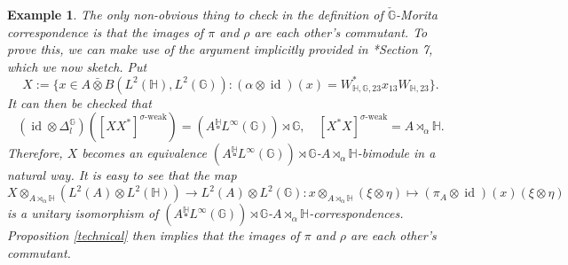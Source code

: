 \documentclass[reqno]{amsart}
\numberwithin{equation}{section}
\newtheorem{Exa}[Theorem]{Example}
\DeclareMathOperator{\id}{\mathrm{id}}
\newcommand{\G}{\mathbb{G}}
\newcommand{\ovot}{\bar{\otimes}}
\begin{document}
\begin{Exa}
The only non-obvious thing to check in the definition of $\check{\G}$-Morita correspondence is that the images of $\pi$ and $\rho$ are each other's commutant. To prove this, we can make use of the argument implicitly provided in \cite{Vae05}*{Section 7}, which we now sketch. Put
  $$X:= \{x \in A \ovot B(L^2(\mathbb{H}), L^2(\G)): (\alpha\otimes \id)(x) = W_{\mathbb{H}, \G, 23}^*x_{13}W_{\mathbb{H}, 23}\}.$$
 It can then be checked that
 $$(\id \otimes \Delta_l^\G)([XX^*]^{\sigma\text{-weak}})= (A \overset{\mathbb{H}}{\square} L^\infty(\G))\rtimes \G, \quad [X^*X]^{\sigma\text{-weak}}= A\rtimes_\alpha \mathbb{H}.$$
 Therefore, $X$ becomes an equivalence $(A \overset{\mathbb{H}}{\square} L^\infty(\G))\rtimes \G$-$A\rtimes_\alpha \mathbb{H}$-bimodule in a natural way. It is easy to see that the map
 $$X \otimes_{A\rtimes_\alpha \mathbb{H}} (L^2(A)\otimes L^2(\mathbb{H}))\to L^2(A)\otimes L^2(\G): x \otimes_{A\rtimes_\alpha \mathbb{H}} (\xi \otimes \eta)\mapsto (\pi_A\otimes \id)(x)(\xi \otimes \eta)$$
 is a unitary isomorphism of $(A \overset{\mathbb{H}}{\square} L^\infty(\G))\rtimes \G$-$A\rtimes_\alpha \mathbb{H}$-correspondences. Proposition \ref{technical} then implies that the images of $\pi$ and $\rho$ are each other's commutant.%
 \end{Exa}
 
\end{document}

